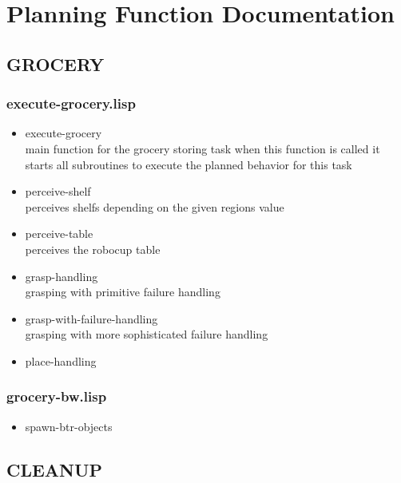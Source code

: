 \documentclass[main.tex]{subfiles}
\begin{document}
	\begingroup

	\renewcommand{\cleardoublepage}{}

	\renewcommand{\clearpage}{}

	\chapter{Planning Function Documentation}

		\chapterauthor{}
		
		\section{GROCERY}
		
		\subsection{execute-grocery.lisp}
		
		\begin{itemize}
			\item execute-grocery \\
			main function for the grocery storing task when this function is called it starts all subroutines to execute the planned behavior for this task
			\item perceive-shelf \\
			perceives shelfs depending on the given regions value
			\item perceive-table \\
			perceives the robocup table
			\item grasp-handling \\
			grasping with primitive failure handling
			\item grasp-with-failure-handling \\
			grasping with more sophisticated failure handling
			\item place-handling
		\end{itemize}
		
		\subsection{grocery-bw.lisp}
		
		\begin{itemize}
			\item spawn-btr-objects
		\end{itemize}
	  	
	  	\section{CLEANUP}
\end{document}
